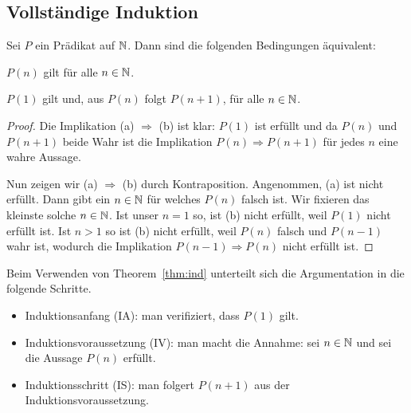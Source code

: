 \subsection{Vollständige Induktion} 

\begin{thm} \label{thm:ind}
	Sei $P$ ein Prädikat auf $\mathbb{N}$. Dann sind die folgenden Bedingungen äquivalent: 
	\begin{enuma}
			\item $P(n)$ gilt für alle $n \in \mathbb{N}$. 
			\item  $P(1)$ gilt und, aus $P(n)$ folgt $P(n+1)$, für alle $n \in \mathbb{N}$. 
	\end{enuma} 
\end{thm} 
\begin{proof} 
	Die Implikation (a) $\Rightarrow$ (b) ist klar: $P(1)$ ist erfüllt und da $P(n)$ und $P(n+1)$ beide Wahr ist die Implikation $P(n) \Rightarrow P(n+1)$ für jedes $n$ eine wahre Aussage. 
	
	Nun zeigen wir (a) $\Rightarrow$ (b) durch Kontraposition. Angenommen, (a) ist nicht erfüllt. Dann gibt ein $n \in \mathbb{N}$ für welches $P(n)$ falsch ist. Wir fixieren das kleinste solche $n \in \mathbb{N}$. Ist unser $n=1$ so, ist (b) nicht erfüllt, weil $P(1)$ nicht erfüllt ist. Ist $n>1$ so ist (b) nicht erfüllt, weil $P(n)$ falsch und $P(n-1)$ wahr ist, wodurch die Implikation $P(n-1) \Rightarrow P(n)$ nicht erfüllt ist. 
\end{proof} 

\begin{bem}
	Beim Verwenden von Theorem~\ref{thm:ind} unterteilt sich die Argumentation in die folgende Schritte. 
	\begin{itemize}
		\item Induktionsanfang (IA): man verifiziert, dass $P(1)$ gilt. 
		\item Induktionsvoraussetzung (IV): man macht die Annahme: sei $n \in \mathbb{N}$ und sei die Aussage $P(n)$ erfüllt. 
		\item Induktionsschritt (IS): man folgert $P(n+1)$ aus der Induktionsvoraussetzung.  
	\end{itemize} 
\end{bem} 

